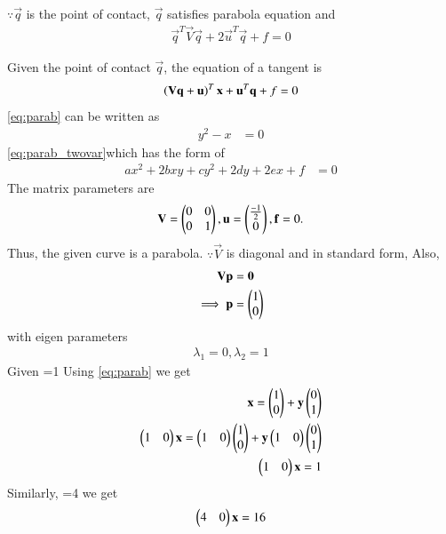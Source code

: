 \documentclass[journal,12pt,twocolumn]{IEEEtran}
\begin{document}
$\because \vec{q}$ is the point of contact, $\vec{q}$ satisfies parabola equation
and 
\begin{align}
\vec{q}^T\vec{V}\vec{q} + 2\vec{u}^T\vec{q} +f = 0
\label{eq:conic_tangent_qquad}
\end{align}

\item 
Given the point of contact $\vec{q}$, the equation of a tangent is 
\begin{align}
\left(\mathbf{V}\mathbf{q}+\mathbf{u}\right)^T\mathbf{x}+\mathbf{u}^T\mathbf{q}+f = 0
\label{eq:conic_tangent_final}
\end{align}
\eqref{eq:parab} can be written as
\begin{align}
 y^2  -x &= 0
\label{eq:parab_twovar}
\end{align}
\eqref{eq:parab_twovar}which has the form of
\begin{align}\label{eq:conic_quad form}
ax^2+2bxy+cy^2+2dy+2ex+f &= 0
\end{align}
The matrix parameters  are
\begin{align}
\mathbf{V} = \begin{pmatrix}0 & 0\\0 & 1\end{pmatrix}, \mathbf{u} = \begin{pmatrix}\frac{-1}{2}\\0\end{pmatrix}, \mathbf{f}=0.
\label{eq:parab_twovar_params}
\end{align}
Thus, the given curve is a parabola.  $\because \vec{V}$ is diagonal and in standard form,
Also, 
\begin{align}
\mathbf{V}\mathbf{p} &= \mathbf{0}
\\
\implies \mathbf{p} &= \begin{pmatrix}1\\0\end{pmatrix}
\label{eq:parab_twovar_p}
\end{align}
with eigen parameters\\
\begin{align}
\lambda_1=0, \lambda_2=1
\end{align}
Given =1  Using \eqref{eq:parab} we get
\begin{align}
\mathbf{x}=\begin{pmatrix}1\\0\end{pmatrix}+\mathbf{y}\begin{pmatrix}0\\1\end{pmatrix}\\
\begin{pmatrix}1 & 0\end{pmatrix}\mathbf{x}=\begin{pmatrix}1 & 0\end{pmatrix}\begin{pmatrix}1\\0\end{pmatrix}+\mathbf{y}\begin{pmatrix}1 & 0\end{pmatrix}\begin{pmatrix}0\\1\end{pmatrix}\\
\begin{pmatrix}1 & 0\end{pmatrix}\mathbf{x}=1\label{eq:line1}
\end{align}
Similarly, =4 we get
\begin{align}\label{eq:line2}
\begin{pmatrix}4 & 0\end{pmatrix}\mathbf{x}=16
\end{align}
\end{document}
